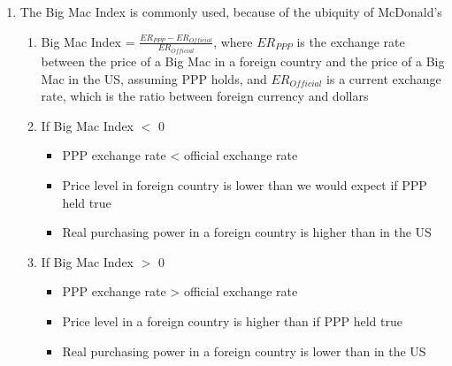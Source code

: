 \documentclass[12pt]{article}
\begin{document}
\begin{enumerate}
\begin{enumerate}
\begin{enumerate}
\begin{enumerate}
                \end{enumerate}

              \item The Big Mac Index is commonly used, because of the ubiquity of McDonald's

                \begin{enumerate}

                  \item Big Mac Index = $\frac{ER_{PPP}-ER_{Official}}{ER_{Official}}$, where $ER_{PPP}$ is the exchange rate between the price of a Big Mac in a foreign country and the price of a Big Mac in the US, assuming PPP holds, and $ER_{Official}$ is a current exchange rate, which is the ratio between foreign currency and dollars

                  \item If Big Mac Index $<$ 0

                    \begin{itemize}

                      \item PPP exchange rate < official exchange rate

                      \item Price level in foreign country is lower than we would expect if PPP held true

                      \item Real purchasing power in a foreign country is higher than in the US

                    \end{itemize}

                  \item If Big Mac Index $>$ 0

                    \begin{itemize}
                        
                      \item PPP exchange rate > official exchange rate

                      \item Price level in a foreign country is higher than if PPP held true

                      \item Real purchasing power in a foreign country is lower than in the US

                    \end{itemize}

                \end{enumerate}


\end{enumerate}
\end{enumerate}
\end{enumerate}
\end{document}
